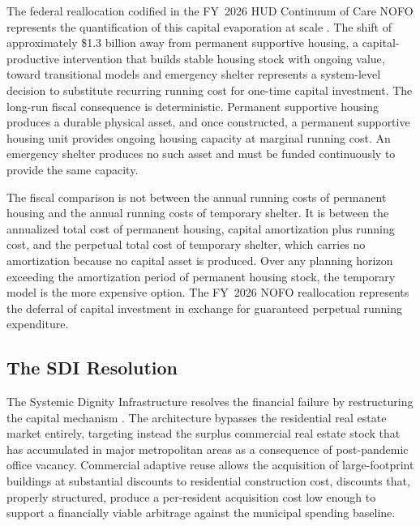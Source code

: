 \documentclass[12pt, letterpaper]{article}
\begin{document}
The federal reallocation codified in the FY~2026 HUD Continuum of Care NOFO represents the quantification of this capital evaporation at scale \citep{hud_nofo_2026}. The shift of approximately \$1.3 billion away from permanent supportive housing, a capital-productive intervention that builds stable housing stock with ongoing value, toward transitional models and emergency shelter represents a system-level decision to substitute recurring running cost for one-time capital investment. The long-run fiscal consequence is deterministic. Permanent supportive housing produces a durable physical asset, and once constructed, a permanent supportive housing unit provides ongoing housing capacity at marginal running cost. An emergency shelter produces no such asset and must be funded continuously to provide the same capacity.

The fiscal comparison is not between the annual running costs of permanent housing and the annual running costs of temporary shelter. It is between the annualized total cost of permanent housing, capital amortization plus running cost, and the perpetual total cost of temporary shelter, which carries no amortization because no capital asset is produced. Over any planning horizon exceeding the amortization period of permanent housing stock, the temporary model is the more expensive option. The FY~2026 NOFO reallocation represents the deferral of capital investment in exchange for guaranteed perpetual running expenditure.

\subsection{The SDI Resolution}

The Systemic Dignity Infrastructure resolves the financial failure by restructuring the capital mechanism \citep{dibella_wp1_2026}. The architecture bypasses the residential real estate market entirely, targeting instead the surplus commercial real estate stock that has accumulated in major metropolitan areas as a consequence of post-pandemic office vacancy. Commercial adaptive reuse allows the acquisition of large-footprint buildings at substantial discounts to residential construction cost, discounts that, properly structured, produce a per-resident acquisition cost low enough to support a financially viable arbitrage against the municipal spending baseline.
\end{document}
